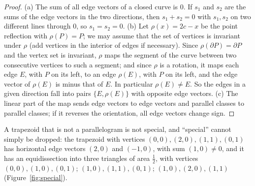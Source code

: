 \documentclass[11pt]{article}
\theoremstyle{definition}
\begin{document}
\begin{proof}
(a) The sum of all edge vectors of a closed curve is $0$. If $s_1$ and $s_2$ are the sums of the
edge vectors in the two directions, then $s_1+s_2=0$ with $s_1,s_2$ on two different lines through
$0$, so $s_1=s_2=0$. (b) Let $\rho(x)=2c-x$ be the point reflection with $\rho(P)=P$; we may assume
that the set of vertices is invariant under $\rho$ (add vertices in the interior of edges if
necessary). Since $\rho(\partial P)=\partial P$ and the vertex set is invariant, $\rho$ maps the segment
of the curve between two consecutive vertices to such a segment; and since $\rho$ is a rotation,
it maps each edge $E$, with $P$ on its left, to an edge $\rho(E)$, with $P$ on its left, and the edge vector of $\rho(E)$ is minus that of $E$. In
particular $\rho(E)\ne E$. So the edges in a given direction fall into pairs $\{E,\rho(E)\}$ with
opposite edge vectors. (c) The linear part of the map sends edge vectors to edge vectors and
parallel classes to parallel classes; if it reverses the orientation, all edge vectors change sign.
\end{proof}

A trapezoid that is not a parallelogram is not special, and ``special'' cannot simply be dropped:
the trapezoid with vertices $(0,0),(2,0),(1,1),(0,1)$ has horizontal edge vectors $(2,0)$ and
$(-1,0)$, with sum $(1,0)\ne0$, and it has an equidissection into three triangles of area
$\tfrac12$, with vertices $(0,0),(1,0),(0,1)$; $(1,0),(1,1),(0,1)$; $(1,0),(2,0),(1,1)$
(Figure~\ref{fig:special}).
\end{document}
